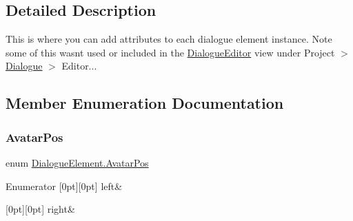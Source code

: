 \subsection{Detailed Description}
This is where you can add attributes to each dialogue element instance. Note some of this wasn\textquotesingle{}t used or included in the \mbox{\hyperlink{class_dialogue_editor}{Dialogue\+Editor}} view under Project $>$ \mbox{\hyperlink{class_dialogue}{Dialogue}} $>$ Editor... 



\subsection{Member Enumeration Documentation}
\mbox{\label{class_dialogue_element_a4713e15d24a53d5487f1d51b89cd55ee}} 
\subsubsection{\texorpdfstring{Avatar\+Pos}{AvatarPos}}
{\footnotesize\ttfamily enum \mbox{\hyperlink{class_dialogue_element_a4713e15d24a53d5487f1d51b89cd55ee}{Dialogue\+Element.\+Avatar\+Pos}}\hspace{0.3cm}{\ttfamily [strong]}}

\begin{DoxyEnumFields}{Enumerator}
[0pt][0pt]{}\mbox{\label{class_dialogue_element_a4713e15d24a53d5487f1d51b89cd55eea811882fecd5c7618d7099ebbd39ea254}} 
left&\\
\hline

[0pt][0pt]{}\mbox{\label{class_dialogue_element_a4713e15d24a53d5487f1d51b89cd55eea7c4f29407893c334a6cb7a87bf045c0d}} 
right&\\
\hline

\end{DoxyEnumFields}
\mbox{\label{class_dialogue_element_ae49b75aacbe9e237b4801a4153dd1bfa}} 
